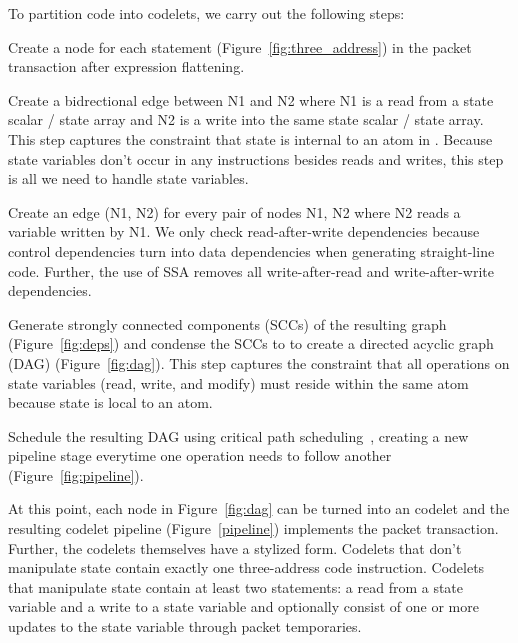 To partition code into codelets, we carry out the following steps:
\begin{CompactEnumerate}
  \item Create a node for each statement (Figure~\ref{fig:three_address}) in
    the packet transaction after expression flattening.
  \item Create a bidrectional edge between N1 and N2 where N1 is a read from a
    state scalar / state array and N2 is a write into the same state scalar /
    state array. This step captures the constraint that state is internal to an
    atom in \absmachine. Because state variables don't occur in any
    instructions besides reads and writes, this step is all we need to handle
    state variables.
  \item Create an edge (N1, N2) for every pair of nodes N1, N2 where N2 reads
    a variable written by N1. We only check read-after-write dependencies because
    control dependencies turn into data dependencies when generating straight-line
    code. Further, the use of SSA removes all write-after-read and write-after-write
    dependencies.
  \item Generate strongly connected components (SCCs) of the resulting graph
    (Figure~\ref{fig:deps}) and condense the SCCs to to create a directed
    acyclic graph (DAG) (Figure~\ref{fig:dag}). This step captures the
    constraint that all operations on state variables (read, write, and modify)
    must reside within the same atom because state is local to an atom.
  \item Schedule the resulting DAG using critical path
    scheduling~\cite{crit_path_sched}, creating a new pipeline stage everytime
    one operation needs to follow another (Figure~\ref{fig:pipeline}).
\end{CompactEnumerate}

At this point, each node in Figure~\ref{fig:dag} can be turned into an codelet
and the resulting codelet pipeline (Figure~\ref{pipeline}) implements the
packet transaction.  Further, the codelets themselves have a stylized form.
Codelets that don't manipulate state contain exactly one three-address code
instruction. Codelets that manipulate state contain at least two statements: a
read from a state variable and a write to a state variable and optionally
consist of one or more updates to the state variable through packet
temporaries.

